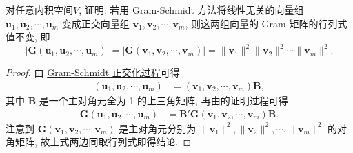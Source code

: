 \documentclass[../../main.tex]{subfiles}
\begin{document}
\begin{proposition}\label{proposition:例9.15}
对任意内积空间$V$,
证明: 若用 Gram-Schmidt 方法将线性无关的向量组 $\boldsymbol{u}_1,\boldsymbol{u}_2,\cdots,\boldsymbol{u}_m$ 变成正交向量组 $\boldsymbol{v}_1,\boldsymbol{v}_2,\cdots,\boldsymbol{v}_m$, 则这两组向量的 Gram 矩阵的行列式值不变, 即
\[
|\boldsymbol{G}(\boldsymbol{u}_1,\boldsymbol{u}_2,\cdots,\boldsymbol{u}_m)| = |\boldsymbol{G}(\boldsymbol{v}_1,\boldsymbol{v}_2,\cdots,\boldsymbol{v}_m)| = \|\boldsymbol{v}_1\|^2\|\boldsymbol{v}_2\|^2\cdots\|\boldsymbol{v}_m\|^2.
\]
\end{proposition}
\begin{proof}
由 \hyperref[theorem:Gram-Schmidt正交化方法]{Gram-Schmidt 正交化过程}可得
\begin{align*}
(\boldsymbol{u}_1,\boldsymbol{u}_2,\cdots,\boldsymbol{u}_m) &= (\boldsymbol{v}_1,\boldsymbol{v}_2,\cdots,\boldsymbol{v}_m)\boldsymbol{B},
\end{align*}
其中 $\boldsymbol{B}$ 是一个主对角元全为 1 的上三角矩阵, 再由的证明过程可得
\begin{align*}
\boldsymbol{G}(\boldsymbol{u}_1,\boldsymbol{u}_2,\cdots,\boldsymbol{u}_m) &= \boldsymbol{B}'\boldsymbol{G}(\boldsymbol{v}_1,\boldsymbol{v}_2,\cdots,\boldsymbol{v}_m)\boldsymbol{B}.
\end{align*}
注意到 $\boldsymbol{G}(\boldsymbol{v}_1,\boldsymbol{v}_2,\cdots,\boldsymbol{v}_m)$ 是主对角元分别为 $\|\boldsymbol{v}_1\|^2,\|\boldsymbol{v}_2\|^2,\cdots,\|\boldsymbol{v}_m\|^2$ 的对角矩阵, 故上式两边同取行列式即得结论. 

\end{proof}
\end{document}

